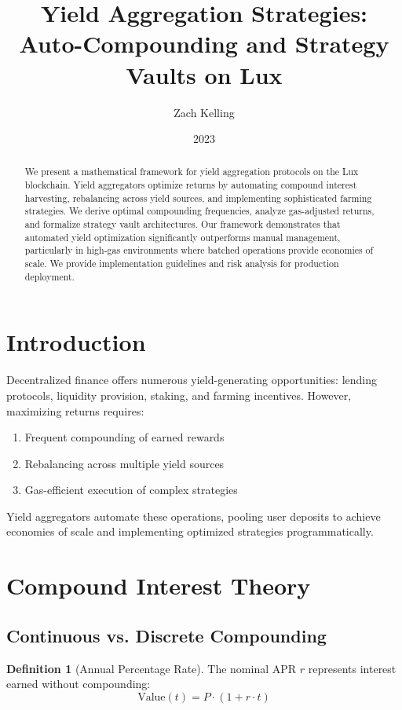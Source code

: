 \documentclass[11pt,a4paper]{article}
\title{Yield Aggregation Strategies: \\
Auto-Compounding and Strategy Vaults on Lux}
\author{Zach Kelling}
\affil{Hanzo Industries \\ Lux Industries \\ Zoo Labs Foundation}
\date{2023}
\theoremstyle{definition}
\newtheorem{definition}{Definition}
\begin{document}
\maketitle

\begin{abstract}
We present a mathematical framework for yield aggregation protocols on the Lux blockchain. Yield aggregators optimize returns by automating compound interest harvesting, rebalancing across yield sources, and implementing sophisticated farming strategies. We derive optimal compounding frequencies, analyze gas-adjusted returns, and formalize strategy vault architectures. Our framework demonstrates that automated yield optimization significantly outperforms manual management, particularly in high-gas environments where batched operations provide economies of scale. We provide implementation guidelines and risk analysis for production deployment.
\end{abstract}

\section{Introduction}

Decentralized finance offers numerous yield-generating opportunities: lending protocols, liquidity provision, staking, and farming incentives. However, maximizing returns requires:

\begin{enumerate}
\item Frequent compounding of earned rewards
\item Rebalancing across multiple yield sources
\item Gas-efficient execution of complex strategies
\end{enumerate}

Yield aggregators automate these operations, pooling user deposits to achieve economies of scale and implementing optimized strategies programmatically.

\section{Compound Interest Theory}

\subsection{Continuous vs. Discrete Compounding}

\begin{definition}[Annual Percentage Rate]
The nominal APR $r$ represents interest earned without compounding:
\begin{equation}
\text{Value}(t) = P \cdot (1 + r \cdot t)
\end{equation}
\end{definition}
\end{document}
